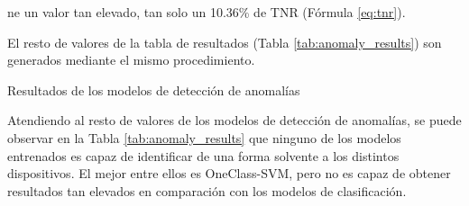 ne un valor tan elevado, tan solo un 10.36\% de TNR (Fórmula \ref{eq:tnr}).

\begin{table}[htpb!]
    \centering
     \qquad
    \caption{Matrices de confusión del Disp. 1 con el modelo de Isolation Forest}
    \label{tab:ex_unsupervised_results}
\end{table}

El resto de valores de la tabla de resultados (Tabla \ref{tab:anomaly_results}) son generados mediante el mismo procedimiento.

\begin{table}[htpb!]
    \centering
    
    \caption{Resultados de los modelos de detección de anomalías}
    \label{tab:anomaly_results}
\end{table}

Atendiendo al resto de valores de los modelos de detección de anomalías, se puede observar en la Tabla \ref{tab:anomaly_results} que ninguno de los modelos entrenados es capaz de identificar de una forma solvente a los distintos dispositivos. El mejor entre ellos es OneClass-SVM, pero no es capaz de obtener resultados tan elevados en comparación con los modelos de clasificación.

